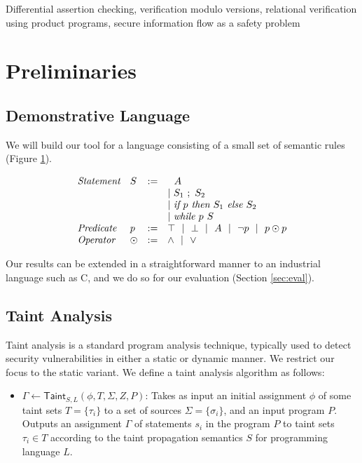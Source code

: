 \documentclass[letterpaper,twocolumn,10pt]{article}
\begin{document}
Differential assertion checking, verification modulo versions, relational verification using product programs, secure information flow as a safety problem

\section{Preliminaries}

\subsection{Demonstrative Language}

We will build our tool for a language consisting of a small set of semantic rules (Figure \ref{fig:semrules}).

\begin{figure}
\caption{}
\label{fig:semrules}
\[
	\begin{array}{l l c l}
		\emph{Statement} & S & := & 
			\ \ A \\
			& & & |~ S_1\ ;\ S_2 \\
			& & & |~ \emph{if }p\emph{ then } S_1 \emph{ else } S_2 \\
			& & & |~ \emph{while }p\emph{ } S \\
		\emph{Predicate} & p &:=& \top ~~|~~ \bot ~~|~~ A ~~|~~ \lnot p ~~|~~ p \odot p \\
		\emph{Operator} & \odot &:=& \land ~~|~~ \lor \\
	\end{array}
\]
\end{figure}

Our results can be extended in a straightforward manner to an industrial language such as C, and we do so for our evaluation (Section \ref{sec:eval}).

\subsection{Taint Analysis}

Taint analysis is a standard program analysis technique, typically used to detect security vulnerabilities in either a static or dynamic manner. 
We restrict our focus to the static variant. We define a taint analysis algorithm as follows:

\begin{itemize}
    \item $\Gamma \gets \mathsf{Taint}_{S,L}(\phi, T, \Sigma, Z, P)$: Takes as input an initial assignment $\phi$ of some taint sets $T = \{\tau_i\}$ to 
    a set of sources $\Sigma = \{\sigma_i\}$, and an input program $P$. Outputs an 
    assignment $\Gamma$ of statements $s_i$ in the program $P$ to taint sets $\tau_i \in T$ according to the taint propagation semantics $S$ for programming
    language $L$.
\end{itemize}
\end{document}

